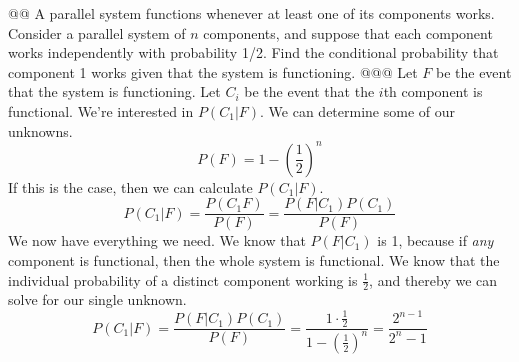 \documentclass[10pt]{article}
\begin{document}
\begin{easylist}[enumerate]
    @@ A parallel system functions whenever at least one of its components works. Consider a parallel system of $n$
    components, and suppose that each component works independently with probability 1/2.  Find the conditional
    probability that component 1 works given that the system is functioning.
    @@@ Let $F$ be the event that the system is functioning. Let $C_i$ be the event that the $i$th component is
    functional. We're interested in $P(C_1|F)$. We can determine some of our unknowns.
        \[ P(F) = 1 - { \left( \frac{1}{2} \right) }^n \]
    If this is the case, then we can calculate $P(C_1|F)$.
        \[ P(C_1|F) = \frac{P(C_1F)}{P(F)} = \frac{P(F|C_1)P(C_1)}{P(F)} \]
    We now have everything we need. We know that $P(F|C_1)$ is 1, because if \textit{any} component is functional, then
    the whole system is functional. We know that the individual probability of a distinct component working is
    $\frac{1}{2}$, and thereby we can solve for our single unknown.
        \[
            P(C_1|F) = \frac{P(F|C_1)P(C_1)}{P(F)} =
            \frac{1 \cdot \frac{1}{2}}
            {1-{\left(\frac{1}{2}\right)}^n} =
            \boxed{\frac{2^{n-1}}{2^n - 1}}
        \]


\end{easylist}
\end{document}
